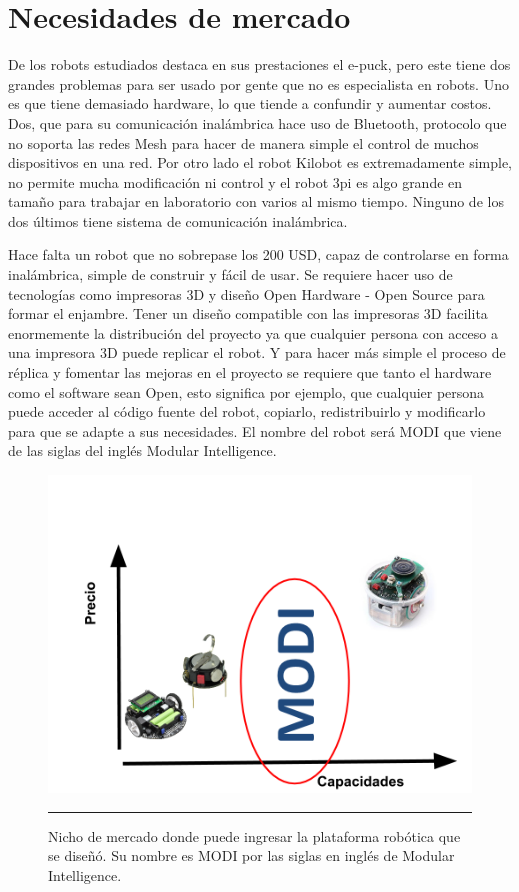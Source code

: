 \section{Necesidades de mercado}

De los robots estudiados destaca en sus prestaciones el e-puck, pero este tiene dos grandes problemas para ser usado por gente que no es especialista en robots. Uno es que tiene demasiado hardware, lo que tiende a confundir y aumentar costos. Dos, que para su comunicación inalámbrica hace uso de Bluetooth, protocolo que no soporta las redes Mesh para hacer de manera simple el control de muchos dispositivos en una red. Por otro lado el robot Kilobot es extremadamente simple, no permite mucha modificación ni control y el robot 3pi es algo grande en tamaño para trabajar en laboratorio con varios al mismo tiempo. Ninguno de los dos últimos tiene sistema de comunicación inalámbrica.

Hace falta un robot que no sobrepase los 200 USD, capaz de controlarse en forma inalámbrica, simple de construir y fácil de usar. Se requiere hacer uso de tecnologías como impresoras 3D y diseño Open Hardware - Open Source para formar el enjambre. Tener un diseño compatible con las impresoras 3D facilita enormemente la distribución del proyecto ya que cualquier persona con acceso a una impresora 3D puede replicar el robot. Y para hacer más simple el proceso de réplica y fomentar las mejoras en el proyecto se requiere que tanto el hardware como el software sean Open, esto significa por ejemplo, que cualquier persona puede acceder al código fuente del robot, copiarlo, redistribuirlo y modificarlo para que se adapte a sus necesidades. El nombre del robot será MODI que viene de las siglas del inglés Modular Intelligence.

\begin{figure}[htbp]
	\centering
		\includegraphics[width=\textwidth]{./Figures/nicho.png}
		\rule{35em}{0.5pt}
	\caption[Nicho de mercado]{Nicho de mercado donde puede ingresar la plataforma robótica que se diseñó. Su nombre es MODI por las siglas en inglés de Modular Intelligence.}
	\label{fig:nicho}
\end{figure}



